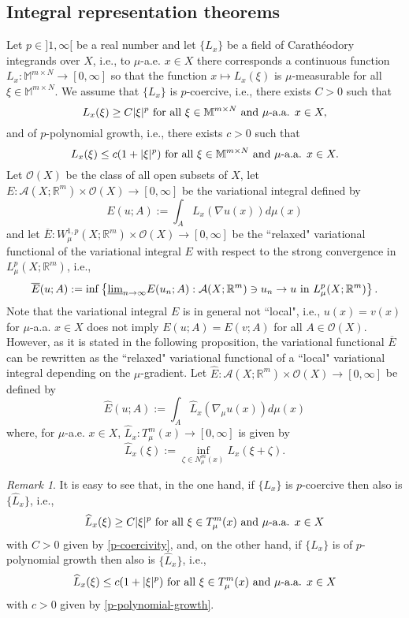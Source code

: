 \documentclass[10pt]{amsart}
\numberwithin{equation}{section}
\theoremstyle{definition}
\theoremstyle{remark}
\newtheorem{remark}[theorem]{Remark}
\begin{document}
\subsection{Integral representation theorems} Let $p\in]1,\infty[$ be a real number and let $\{L_x\}$ be a field of Carath\'eodory integrands over $X$, i.e., to $\mu$-a.e. $x\in X$ there corresponds a continuous function $L_x:{{\mathbb M}^{m\times N}}\to[0,\infty]$ so that the function $x\mapsto L_x(\xi)$ is $\mu$-measurable for all $\xi\in{{\mathbb M}^{m\times N}}$. We assume that $\{L_x\}$ is $p$-coercive, i.e., there exists $C>0$ such that
\begin{equation}\label{p-coercivity}
L_x(\xi)\geq C|\xi|^p\hbox{ for all }\xi\in{{\mathbb M}^{m\times N}}\hbox{ and $\mu$-a.a. }x\in X,
\end{equation}
and of $p$-polynomial growth, i.e., there exists $c>0$ such that
\begin{equation}\label{p-polynomial-growth}
L_x(\xi)\leq c(1+|\xi|^p)\hbox{ for all }\xi\in{{\mathbb M}^{m\times N}}\hbox{ and $\mu$-a.a. }x\in X.
\end{equation}
Let $\mathcal{O}(X)$ be the class of all open subsets of $X$, let $E:\mathcal{A}(X;{{\mathbb R}}^m)\times\mathcal{O}(X)\to[0,\infty]$ be the variational integral defined by
$$
E(u;A):=\int_A L_x(\nabla u(x))d\mu(x)
$$
and let $\overline{E}:W^{1,p}_\mu(X;{{\mathbb R}}^m)\times\mathcal{O}(X)\to[0,\infty]$ be the ``relaxed" variational functional of the variational integral $E$ with respect to the strong convergence in $L^p_\mu(X;{{\mathbb R}}^m)$, i.e.,  
$$
\overline{E}(u;A):=\inf\left\{{\mathop{\underline{\lim}}}_{n\to\infty}E(u_n;A):\mathcal{A}(X;{{\mathbb R}}^m)\ni u_n\to u\hbox{ in }{L^p_\mu(X;{{\mathbb R}}^m)}\right\}.
$$
Note that the variational integral $E$ is in general not ``local", i.e., $u(x)=v(x)$ for $\mu$-a.a. $x\in X$ does not imply $E(u;A)=E(v;A)$ for all $A\in\mathcal{O}(X)$. However, as it is stated in the following proposition, the variational functional $\overline{E}$ can be rewritten as the ``relaxed" variational functional of a ``local" variational integral depending on the $\mu$-gradient. Let $\widehat{E}:\mathcal{A}(X;{{\mathbb R}}^m)\times\mathcal{O}(X)\to[0,\infty]$ be defined by
$$
\widehat{E}(u;A):=\int_A \widehat{L}_x(\nabla_\mu u(x))d\mu(x)
$$
where, for $\mu$-a.e. $x\in X$, $\widehat{L}_x:T_\mu^m(x)\to[0,\infty]$ is given by
$$
\widehat{L}_x(\xi):=\inf_{\zeta\in N_\mu^m(x)}L_x(\xi+\zeta).
$$

\begin{remark}\label{p-coercivity-p-polynomial-growth-remark}
It is easy to see that, in the one hand, if $\{L_x\}$ is $p$-coercive then also is $\{\widehat{L}_x\}$, i.e.,
$$
\widehat{L}_x(\xi)\geq C|\xi|^p\hbox{ for all }\xi\in T^m_\mu(x)\hbox{ and $\mu$-a.a. }x\in X
$$
with $C>0$ given by \eqref{p-coercivity}, and, on the other hand, if $\{L_x\}$ is of $p$-polynomial growth then also is $\{\widehat{L}_x\}$, i.e.,
$$
\widehat{L}_x(\xi)\leq c(1+|\xi|^p)\hbox{ for all }\xi\in T^m_\mu(x)\hbox{ and $\mu$-a.a. }x\in X
$$
with $c>0$ given by \eqref{p-polynomial-growth}.
\end{remark}
\end{document}
